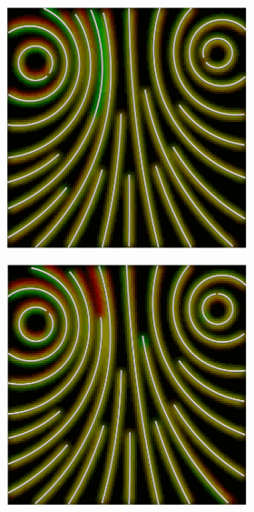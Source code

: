 \begin{figure}[ht]
\begin{subfigure}{\textwidth}
\begin{subfigure}{.19\textwidth}
        \end{subfigure}
        \begin{subfigure}{.19\textwidth}
            \centering
            \includegraphics[scale=.055]{figures/AlphaStudy/Gyro23C.0002.png}
        \end{subfigure}
        \begin{subfigure}{.19\textwidth}
            \centering
            \includegraphics[scale=.055]{figures/AlphaStudy/Gyro23C.0003.png}

\end{subfigure}
\end{subfigure}
\end{figure}
